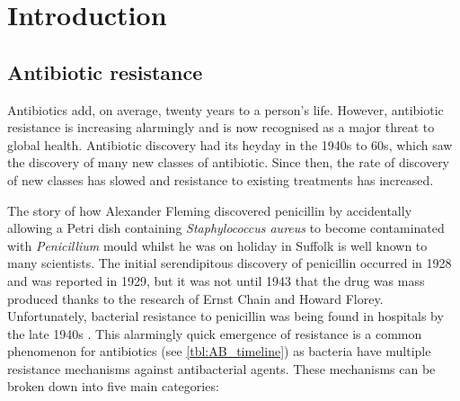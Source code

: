 \section{Introduction}

\subsection{Antibiotic resistance}

Antibiotics add, on average, twenty years to a person's life\cite{davies2013drugs}. However, antibiotic resistance is increasing alarmingly and is now recognised as a major threat to global health\cite{ResistanceUS,davies2013drugs}. Antibiotic discovery had its heyday in the 1940s to 60s, which saw the discovery of many new classes of antibiotic. Since then, the rate of discovery of new classes has slowed and resistance to existing treatments has increased.

The story of how Alexander Fleming discovered penicillin by accidentally allowing a Petri dish containing \textit{Staphylococcus aureus} to become contaminated with \textit{Penicillium} mould whilst he was on holiday in Suffolk \cite{davies2013drugs} is well known to many scientists. The initial serendipitous discovery of penicillin occurred in 1928 and was reported in 1929\cite{Fleming1929}, but it was not until 1943 that the drug was mass produced thanks to the research of Ernst Chain and Howard Florey. Unfortunately, bacterial resistance to penicillin was being found in hospitals by the late 1940s \cite{Barber1947, Rountree1949}. This alarmingly quick emergence of resistance is a common phenomenon for antibiotics (see \ref{tbl:AB_timeline}) as bacteria have multiple resistance mechanisms against antibacterial agents. These mechanisms can be broken down into five main categories\cite{ANIE:ANIE201209979,davies2013drugs}:

